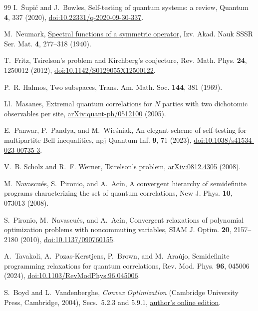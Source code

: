 \documentclass[aps,prl,onecolumn,10pt,superscriptaddress,nofootinbib,longbibliography]{revtex4-2}
\theoremstyle{remark}
\begin{document}
\begin{thebibliography}{99}
I.~\v{S}upi\'c and J.~Bowles,
Self-testing of quantum systems: a review,
Quantum \textbf{4}, 337 (2020),
\href{https://doi.org/10.22331/q-2020-09-30-337}{doi:10.22331/q-2020-09-30-337}.

M.~Neumark,
\href{https://www.mathnet.ru/eng/im3893}{Spectral functions of a symmetric operator},
Izv. Akad. Nauk SSSR Ser. Mat. \textbf{4}, 277--318 (1940).

T.~Fritz,
Tsirelson's problem and Kirchberg's conjecture,
Rev. Math. Phys. \textbf{24}, 1250012 (2012),
\href{https://doi.org/10.1142/S0129055X12500122}{doi:10.1142/S0129055X12500122}.

P.~R. Halmos,
Two subspaces,
Trans. Am. Math. Soc. \textbf{144}, 381 (1969).

Ll.~Masanes,
Extremal quantum correlations for $N$ parties with two dichotomic observables per site,
\href{https://arxiv.org/abs/quant-ph/0512100}{arXiv:quant-ph/0512100} (2005).

E.~Panwar, P.~Pandya, and M.~Wie\'sniak,
An elegant scheme of self-testing for multipartite Bell inequalities,
npj Quantum Inf. \textbf{9}, 71 (2023), \href{https://doi.org/10.1038/s41534-023-00735-3}{doi:10.1038/s41534-023-00735-3}.

V.~B. Scholz and R.~F. Werner,
Tsirelson's problem,
\href{https://arxiv.org/abs/0812.4305}{arXiv:0812.4305} (2008).

M.~Navascu\'es, S.~Pironio, and A.~Ac\'in,
A convergent hierarchy of semidefinite programs characterizing the set of quantum correlations,
New J. Phys. \textbf{10}, 073013 (2008).

S.~Pironio, M.~Navascu\'es, and A.~Ac\'in,
Convergent relaxations of polynomial optimization problems with noncommuting variables,
SIAM J. Optim. \textbf{20}, 2157--2180 (2010),
\href{https://doi.org/10.1137/090760155}{doi:10.1137/090760155}.

A.~Tavakoli, A.~Pozas-Kerstjens, P.~Brown, and M.~Ara\'ujo, Semidefinite programming relaxations for quantum correlations, Rev. Mod. Phys. \textbf{96}, 045006 (2024), \href{https://doi.org/10.1103/RevModPhys.96.045006}{doi:10.1103/RevModPhys.96.045006}.

S.~Boyd and L.~Vandenberghe,
\emph{Convex Optimization} (Cambridge University Press, Cambridge, 2004),
Secs.~5.2.3 and 5.9.1,
\href{https://web.stanford.edu/~boyd/cvxbook/}{author's online edition}.


\end{thebibliography}
\end{document}
